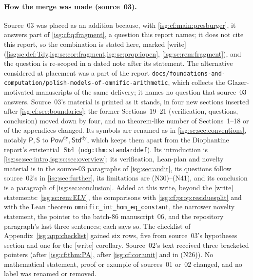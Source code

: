 \documentclass[11pt]{article}
\theoremstyle{definition}
\theoremstyle{remark}
\newcommand{\PowDy}{\mathsf{Pow}^{\mathrm{dy}}}
\newcommand{\StdDy}{\mathsf{Std}^{\mathrm{dy}}}
\newcommand{\replabel}[1]{\nolinkurl{#1}}
\newcommand{\fn}[1]{\nolinkurl{#1}}
\begin{document}
\paragraph{How the merge was made (source~03).} Source~03 was placed as an
addition because, with \cref{isg:cf:main:presburger}, it answers part of
\cref{isg:cf:q:fragment}, a question this report names; it does not cite
this report, so the combination is stated here, marked \textup{[write]}
(\cref{isg:sc:def:Tdy,isg:sc:cor:fragment,isg:sc:prop:iopen},
\cref{isg:sc:rem:fragment}), and the question is re-scoped in a dated note
after its statement. The alternative considered at placement was a part of
the report
\nolinkurl{docs/foundations-and-computation/polish-models-of-omnific-arithmetic},
which collects the Glazer-motivated manuscripts of the same delivery; it
names no question that source~03 answers. Source~03's material is printed
as it stands, in four new sections inserted after \cref{isg:cf:sec:boundaries};
the former Sections~19--21 (verification, questions, conclusion) moved
down by four, and no theorem-like number of Sections~1--18 or of the
appendices changed. Its symbols are renamed as in
\cref{isg:sc:sec:conventions}, notably $\mathsf P,\mathsf S$ to
$\PowDy,\StdDy$, which keeps them apart from the Diophantine report's
existential $\operatorname{Std}$ (\replabel{odg:thm:standarddef}). Its
introduction is \cref{isg:sc:sec:intro,isg:sc:sec:overview}; its
verification, Lean-plan and novelty material is in the source-03
paragraphs of \cref{isg:sec:audit}, its questions follow source~02's in
\cref{isg:sec:further}, its limitations are (N30)--(N41), and its
conclusion is a paragraph of \cref{isg:sec:conclusion}. Added at this
write, beyond the \textup{[write]} statements: \cref{isg:sc:rem:ELV}, the
comparisons with \cref{isg:cf:prop:residuesplit} and with the Lean theorem
\fn{omnific_int_hom_eq_constant}, the narrower novelty statement, the
pointer to the batch-86 manuscript~06, and the repository paragraph's last
three sentences; each says so. The checklist of
Appendix~\ref{isg:app:checklist} gained six rows, five from source~03's
hypotheses section and one for the \textup{[write]} corollary. Source~02's text received three bracketed
pointers (after \cref{isg:cf:thm:PA}, after \cref{isg:cf:cor:unit} and in
\textup{(N26)}). No mathematical statement, proof or example of sources~01
or~02 changed, and no label was renamed or removed.
\end{document}
